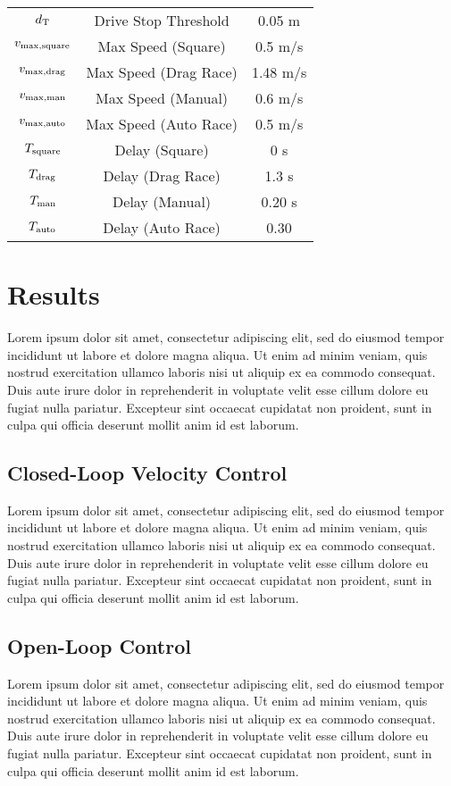\documentclass[conference]{IEEEtran}
\begin{document}
\begin{table}[h]
\begin{center}
\begin{tabular}{|c| c| c|}
    $d_{\rm T}$ &Drive Stop Threshold &0.05 m\\
    $v_{\rm max,square}$ &Max Speed (Square) & 0.5 m/s\\
    $v_{\rm max,drag}$ &Max Speed (Drag Race) & 1.48 m/s\\
    $v_{\rm max,man}$ &Max Speed (Manual) & 0.6 m/s\\
    $v_{\rm max,auto}$ &Max Speed (Auto Race) & 0.5 m/s\\
    $T_{\rm square}$ &Delay (Square) & 0 s\\
    $T_{\rm drag}$ &Delay (Drag Race) & 1.3 s\\
    $T_{\rm man}$ &Delay (Manual) & 0.20 s\\
    $T_{\rm auto}$ &Delay (Auto Race) & 0.30\\
\hline
\end{tabular}
\end{center}
\end{table}


\section{Results}
Lorem ipsum dolor sit amet, consectetur adipiscing elit, sed do eiusmod tempor incididunt ut labore et dolore magna aliqua. Ut enim ad minim veniam, quis nostrud exercitation ullamco laboris nisi ut aliquip ex ea commodo consequat. Duis aute irure dolor in reprehenderit in voluptate velit esse cillum dolore eu fugiat nulla pariatur. Excepteur sint occaecat cupidatat non proident, sunt in culpa qui officia deserunt mollit anim id est laborum.

\subsection{Closed-Loop Velocity Control}
Lorem ipsum dolor sit amet, consectetur adipiscing elit, sed do eiusmod tempor incididunt ut labore et dolore magna aliqua. Ut enim ad minim veniam, quis nostrud exercitation ullamco laboris nisi ut aliquip ex ea commodo consequat. Duis aute irure dolor in reprehenderit in voluptate velit esse cillum dolore eu fugiat nulla pariatur. Excepteur sint occaecat cupidatat non proident, sunt in culpa qui officia deserunt mollit anim id est laborum.

\subsection{Open-Loop Control}
Lorem ipsum dolor sit amet, consectetur adipiscing elit, sed do eiusmod tempor incididunt ut labore et dolore magna aliqua. Ut enim ad minim veniam, quis nostrud exercitation ullamco laboris nisi ut aliquip ex ea commodo consequat. Duis aute irure dolor in reprehenderit in voluptate velit esse cillum dolore eu fugiat nulla pariatur. Excepteur sint occaecat cupidatat non proident, sunt in culpa qui officia deserunt mollit anim id est laborum.
\end{document}
